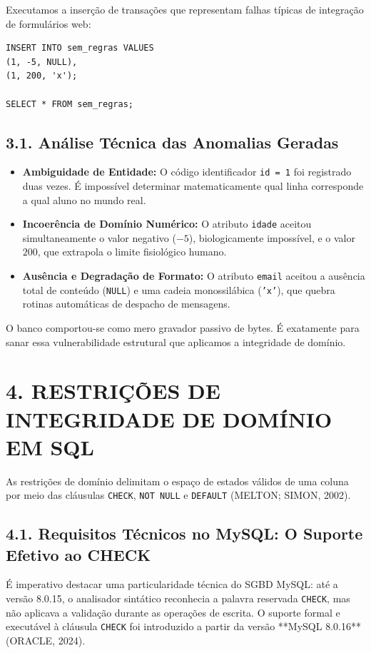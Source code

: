Executamos a inserção de transações que representam falhas típicas de integração de formulários web:

\begin{lstlisting}
INSERT INTO sem_regras VALUES
(1, -5, NULL),
(1, 200, 'x');

SELECT * FROM sem_regras;
\end{lstlisting}

\subsection*{3.1. Análise Técnica das Anomalias Geradas}
\begin{itemize}
    \item \textbf{Ambiguidade de Entidade:} O código identificador \texttt{id = 1} foi registrado duas vezes. É impossível determinar matematicamente qual linha corresponde a qual aluno no mundo real.
    \item \textbf{Incoerência de Domínio Numérico:} O atributo \texttt{idade} aceitou simultaneamente o valor negativo ($-5$), biologicamente impossível, e o valor $200$, que extrapola o limite fisiológico humano.
    \item \textbf{Ausência e Degradação de Formato:} O atributo \texttt{email} aceitou a ausência total de conteúdo (\texttt{NULL}) e uma cadeia monossilábica (\texttt{'x'}), que quebra rotinas automáticas de despacho de mensagens.
\end{itemize}

O banco comportou-se como mero gravador passivo de bytes. É exatamente para sanar essa vulnerabilidade estrutural que aplicamos a integridade de domínio.

\newpage

\section*{4. RESTRIÇÕES DE INTEGRIDADE DE DOMÍNIO EM SQL}

As restrições de domínio delimitam o espaço de estados válidos de uma coluna por meio das cláusulas \texttt{CHECK}, \texttt{NOT NULL} e \texttt{DEFAULT} (MELTON; SIMON, 2002).

\subsection*{4.1. Requisitos Técnicos no MySQL: O Suporte Efetivo ao CHECK}

É imperativo destacar uma particularidade técnica do SGBD MySQL: até a versão 8.0.15, o analisador sintático reconhecia a palavra reservada \texttt{CHECK}, mas não aplicava a validação durante as operações de escrita. O suporte formal e executável à cláusula \texttt{CHECK} foi introduzido a partir da versão **MySQL 8.0.16** (ORACLE, 2024).

